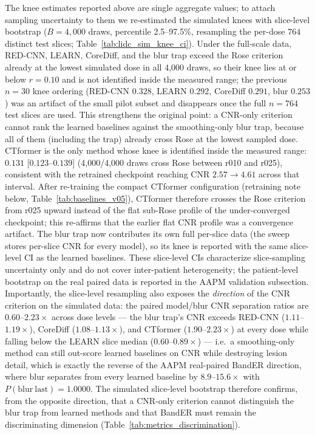 \documentclass[twoside,11pt]{article}
\begin{document}
The knee estimates reported above are single aggregate values; to attach sampling uncertainty to them we re-estimated the simulated knees with slice-level bootstrap ($B=4{,}000$ draws, percentile 2.5--97.5\%, resampling the per-dose $764$ distinct test slices; Table~\ref{tab:lidc_sim_knee_ci}). Under the full-scale data, RED-CNN, LEARN, CoreDiff, and the blur trap exceed the Rose criterion already at the lowest simulated dose in all 4{,}000 draws, so their knee lies at or below $r=0.10$ and is not identified inside the measured range; the previous $n=30$ knee ordering (RED-CNN $0.328$, LEARN $0.292$, CoreDiff $0.291$, blur $0.253$) was an artifact of the small pilot subset and disappears once the full $n=764$ test slices are used. This strengthens the original point: a CNR-only criterion cannot rank the learned baselines against the smoothing-only blur trap, because all of them (including the trap) already cross Rose at the lowest sampled dose. CTformer is the only method whose knee is identified inside the measured range: $0.131$ [$0.123$--$0.139$] (4{,}000/4{,}000 draws cross Rose between r010 and r025), consistent with the retrained checkpoint reaching CNR $2.57\to4.61$ across that interval. After re-training the compact CTformer configuration (retraining note below, Table~\ref{tab:baselines_v05}), CTformer therefore crosses the Rose criterion from r025 upward instead of the flat sub-Rose profile of the under-converged checkpoint; this re-affirms that the earlier flat CNR profile was a convergence artifact. The blur trap now contributes its own full per-slice data (the sweep stores per-slice CNR for every model), so its knee is reported with the same slice-level CI as the learned baselines. These slice-level CIs characterize slice-sampling uncertainty only and do not cover inter-patient heterogeneity; the patient-level bootstrap on the real paired data is reported in the AAPM validation subsection. Importantly, the slice-level resampling also exposes the \emph{direction} of the CNR criterion on the simulated data: the paired model/blur CNR separation ratios are $0.60$--$2.23\times$ across dose levels --- the blur trap's CNR exceeds RED-CNN ($1.11$--$1.19\times$), CoreDiff ($1.08$--$1.13\times$), and CTformer ($1.90$--$2.23\times$) at every dose while falling below the LEARN slice median ($0.60$--$0.89\times$) --- i.e.\ a smoothing-only method can still out-score learned baselines on CNR while destroying lesion detail, which is exactly the reverse of the AAPM real-paired BandER direction, where blur separates from every learned baseline by $8.9$--$15.6\times$ with $P(\mathrm{blur~last})=1.0000$. The simulated slice-level bootstrap therefore confirms, from the opposite direction, that a CNR-only criterion cannot distinguish the blur trap from learned methods and that BandER must remain the discriminating dimension (Table~\ref{tab:metrics_discrimination}).
\end{document}
